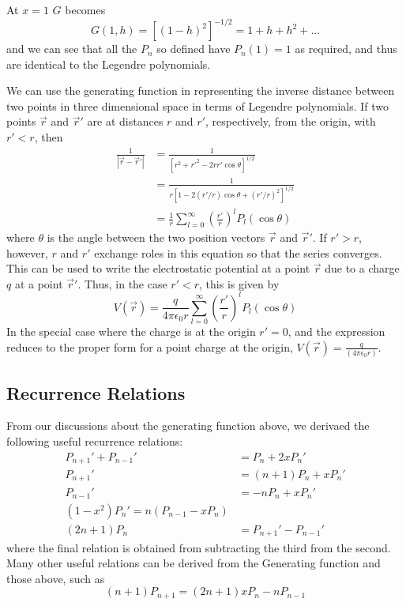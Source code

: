 \documentclass[12pt, a4paper, oneside, openright, titlepage]{book}
\begin{document}
At $x = 1$ $G$ becomes \begin{equation*}
    G(1,h) = [(1-h)^2]^{-1/2} = 1+h+h^2+...
\end{equation*}
and we can see that all the $P_n$ so defined have $P_n(1) = 1$ as required, and thus are identical to the Legendre polynomials.

\begin{eg}
    We can use the generating function in representing the inverse distance between two points in three dimensional space in terms of Legendre polynomials. If two points $\vec{r}$ and $\vec{r}'$ are at distances $r$ and $r'$, respectively, from the origin, with $r' < r$, then \begin{align*}
        \frac{1}{|\vec{r}-\vec{r}'|} &= \frac{1}{[r^2+{r'}^2-2rr'\cos\theta]^{1/2}} \\
        &= \frac{1}{r[1-2(r'/r)\cos\theta + (r'/r)^2]^{1/2}} \\
        &=\frac{1}{r}\sum_{l=0}^{\infty}\left(\frac{r'}{r}\right)^lP_l(\cos\theta)
    \end{align*}
    where $\theta$ is the angle between the two position vectors $\vec{r}$ and $\vec{r}'$. If $r' > r$, however, $r$ and $r'$ exchange roles in this equation so that the series converges. This can be used to write the electrostatic potential at a point $\vec{r}$ due to a charge $q$ at a point $\vec{r}'$. Thus, in the case $r' < r$, this is given by \begin{equation*}
        V(\vec{r}) = \frac{q}{4\pi \epsilon_0r}\sum_{l=0}^{\infty}\left(\frac{r'}{r}\right)^lP_l(\cos\theta)
    \end{equation*}
    In the special case where the charge is at the origin $r' = 0$, and the expression reduces to the proper form for a point charge at the origin, $V(\vec{r}) = \frac{q}{(4\pi \epsilon_0r)}$.
\end{eg}

\subsection{Recurrence Relations}

From our discussions about the generating function above, we derivaed the following useful recurrence relations: \begin{align}
    P_{n+1}'+P_{n-1}'&= P_n + 2xP_n' \\
    P_{n+1}' &= (n+1)P_n+xP_n' \\
    P_{n-1}' &= -nP_n + xP_n' \\
    (1-x^2)P_n' = n(P_{n-1} - xP_n) \\
    (2n+1)P_n &= P_{n+1}' - P_{n-1}' 
\end{align}
where the final relation is obtained from subtracting the third from the second. Many other useful relations can be derived from the Generating function and those above, such as \begin{equation*}
    (n+1)P_{n+1} = (2n+1)xP_n - nP_{n-1}
\end{equation*}
\end{document}
